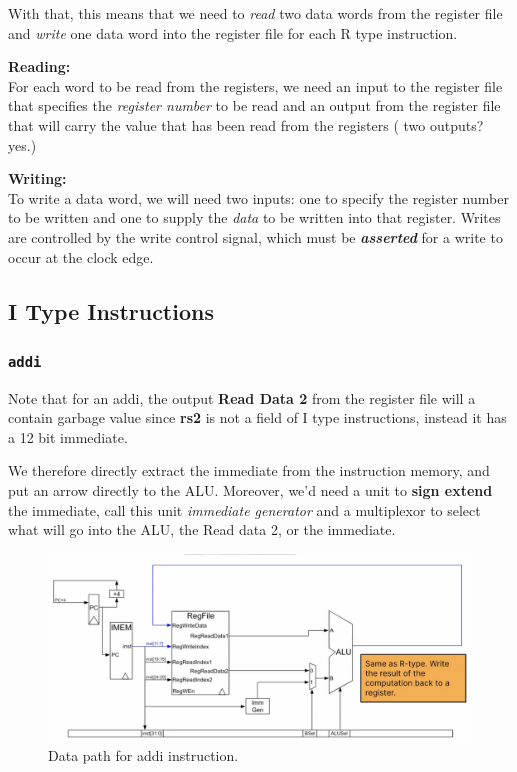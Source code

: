 \documentclass[12pt]{article}
\begin{document}
With that, this means that we need to \emph{read} two data words from the register file and \emph{write} one data word into the register file for each R type instruction.

\textbf{Reading:}\\
For each word to be read from the registers, we need an input to the register file that specifies the \emph{register number} to be read and an output from the register file that will carry the value that has been read from the registers ({\color{red} two outputs? yes.})

\textbf{Writing:}\\
To write a data word, we will need two inputs: one to specify the register number to be written and one to supply the \emph{data} to be written into that register. Writes are controlled by the write control signal, which must be \emph{\textbf{asserted}} for a write to occur at the clock edge.

\subsection*{I Type Instructions}
\subsubsection*{\lstinline{addi}}
Note that for an addi, the output \textbf{Read Data 2} from the register file will a contain garbage value since \textbf{rs2} is not a field of I type instructions, instead it has a 12 bit immediate.

We therefore directly extract the immediate from the instruction memory, and put an arrow directly to the ALU. Moreover, we'd need a unit to \textbf{sign extend} the immediate, call this unit \emph{immediate generator} and a multiplexor to select what will go into the ALU, the Read data 2, or the immediate.

\begin{figure}[h]
    \centering
    \includegraphics[scale=0.3]{images/addi-datapath.png}
    \caption{Data path for addi instruction.}
\end{figure}
\end{document}
